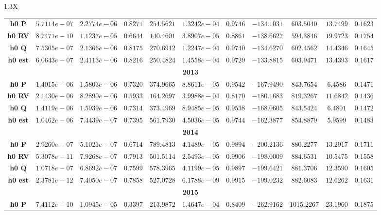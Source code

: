 \documentclass[10pt]{article}
\begin{document}
{\begin{tabularx}{1.3\textwidth}{X}
{\begin{tabular}{ccccccccccc}
\cmidrule(r){1-11} 
 { {\bf h0 P}}& $5.7114e-07$ & $2.2774e-06$ & $0.8271$ & $254.5621$ & $1.3242e-04$ & $0.9746$ & $-134.1031$& $603.5040$& $13.7499$ &$0.1623$\\
 { {\bf h0 RV}}& $8.7471e-10$ & $1.1237e-05$ & $0.6644$ & $140.4601$ & $3.8907e-05$ & $0.8861$ & $-138.6627$& $594.3846$& $19.9723$ &$0.1754$\\
 { {\bf h0 Q}}& $7.5305e-07$ & $2.1366e-06$ & $0.8175$ & $270.6912$ & $1.2247e-04$ & $0.9740$ & $-134.6270$& $602.4562$& $14.4346$ &$0.1645$\\
 { {\bf h0 est}}& $6.0643e-07$ & $2.4113e-06$ & $0.8216$ & $250.4824$ & $1.4558e-04$ & $0.9729$ & $-133.8815$& $603.9471$& $13.4393$ &$0.1617$\\
\bottomrule
\multicolumn{11}{c}{{\bf2013}} \\
\cmidrule(r){1-11} 
 { {\bf h0 P}}& $1.4015e-06$ & $1.5803e-06$ & $0.7320$ & $374.9665$ & $8.8611e-05$ & $0.9542$ & $-167.9490$& $843.7654$& $6.4586$ &$0.1471$\\
 { {\bf h0 RV}}& $2.1430e-06$ & $8.2890e-06$ & $0.5933$ & $164.2697$ & $3.9988e-04$ & $0.8170$ & $-180.1683$& $819.3267$& $11.6842$ &$0.1436$\\
 { {\bf h0 Q}}& $1.4119e-06$ & $1.5939e-06$ & $0.7314$ & $373.4969$ & $8.9485e-05$ & $0.9538$ & $-168.0605$& $843.5424$& $6.4801$ &$0.1472$\\
 { {\bf h0 est}}& $1.0462e-06$ & $7.4439e-07$ & $0.7395$ & $561.7930$ & $4.5036e-05$ & $0.9744$ & $-162.3877$& $854.8879$& $5.9599$ &$0.1483$\\
\bottomrule
\multicolumn{11}{c}{{\bf2014}} \\
\cmidrule(r){1-11} 
 { {\bf h0 P}}& $2.9260e-07$ & $5.1021e-07$ & $0.6714$ & $789.4813$ & $4.1489e-05$ & $0.9894$ & $-200.2136$& $880.2277$& $13.2917$ &$0.1711$\\
 { {\bf h0 RV}}& $5.3078e-11$ & $7.9268e-07$ & $0.7913$ & $501.5114$ & $2.5493e-05$ & $0.9906$ & $-198.0009$& $884.6531$& $10.5475$ &$0.1558$\\
 { {\bf h0 Q}}& $1.0718e-07$ & $6.8692e-07$ & $0.7599$ & $578.3965$ & $4.1199e-05$ & $0.9897$ & $-199.6421$& $881.3706$& $12.3590$ &$0.1605$\\
 { {\bf h0 est}}& $2.3781e-12$ & $7.4050e-07$ & $0.7858$ & $527.0728$ & $6.1788e-09$ & $0.9915$ & $-199.0232$& $882.6083$& $12.6262$ &$0.1631$\\
\bottomrule
\multicolumn{11}{c}{{\bf2015}} \\
\cmidrule(r){1-11} 
 { {\bf h0 P}}& $7.4112e-10$ & $1.0945e-05$ & $0.3397$ & $213.9872$ & $1.4647e-04$ & $0.8409$ & $-262.9162$& $1015.2267$& $23.1960$ &$0.1875$\\

\end{tabular}}
\end{tabularx}}
\end{document}
